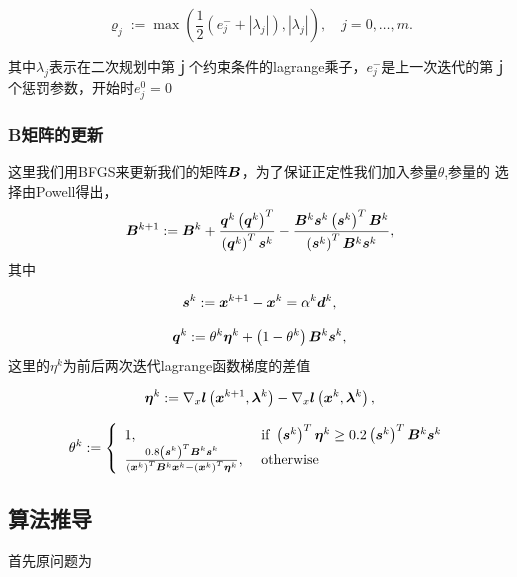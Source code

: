 \documentclass[12pt,oneside,a4paper]{article}
\begin{document}
\begin{equation}\label{1}
\varrho_{j}:=\max \left(\frac{1}{2}\left(e_{j}^{-}+\left|\lambda_{j}\right|\right),
\left|\lambda_{j}\right|\right), \quad j=0, \ldots, m.
\end{equation}

其中$\lambda_{j}$表示在二次规划中第ｊ个约束条件的lagrange乘子，$e_{j}^{-}$是上一次迭代的第ｊ个惩罚参数，开始时$e^0_j=0$


\subsubsection{B矩阵的更新}
这里我们用BFGS来更新我们的矩阵${\boldsymbol B}$，为了保证正定性我们加入参量$\theta$,参量的
选择由Powell\cite{powell}得出，
\begin{equation*}
{\boldsymbol B}^{k+1}:={\boldsymbol B}^{k}+\frac{{\boldsymbol q}^{k}\left({\boldsymbol q}^{k}\right)^{T}}{\left({\boldsymbol q}^{k}\right)^{T} {\boldsymbol s}^{k}}-
\frac{{\boldsymbol B}^{k} {\boldsymbol s}^{k}\left({\boldsymbol s}^{k}\right)^{T} {\boldsymbol B}^{k}}{\left({\boldsymbol s}^{k}\right)^{T} {\boldsymbol B}^{k} {\boldsymbol s}^{k}},
\end{equation*}
其中

\begin{equation*}
{\boldsymbol s}^{k}:={\boldsymbol x}^{k+1}-{\boldsymbol x}^{k}=\alpha^{k} {\boldsymbol d}^{k},
\end{equation*}

\begin{equation*}
{\boldsymbol q}^{k}:=\theta^{k} {\boldsymbol \eta}^{k}+\left(1-\theta^{k}\right) {\boldsymbol B}^{k} {\boldsymbol s}^{k},
\end{equation*}
这里的$\eta^{k}$为前后两次迭代lagrange函数梯度的差值

\begin{equation*}
{\boldsymbol \eta}^{k}:=\nabla_{x} {\boldsymbol l}\left({\boldsymbol x}^{k+1}, {\boldsymbol\lambda}^{k}\right)-
\nabla_{x} {\boldsymbol l}\left({\boldsymbol x}^{k}, {\boldsymbol\lambda}^{k}\right),
\end{equation*}

\begin{equation*}
\theta^{k}:=\left\{\begin{array}{ll}
1, & \text { if }\left({\boldsymbol s}^{k}\right)^{T} {\boldsymbol \eta}^{k} \geq 
0.2\left({\boldsymbol s}^{k}\right)^{T} {\boldsymbol B}^{k} {\boldsymbol s}^{k} \\
\frac{0.8\left({\boldsymbol s}^{k}\right)^{T} {\boldsymbol B}^{k}{\boldsymbol s}^{k}}{\left({\boldsymbol x}^{k}\right)^{T} {\boldsymbol B}^{k}{\boldsymbol x}^{k}-
\left({\boldsymbol x}^{k}\right)^{T} {\boldsymbol \eta}^{k}}, & \text { otherwise }
\end{array}\right.
\end{equation*}

\subsection{算法推导}
首先原问题为
\end{document}
